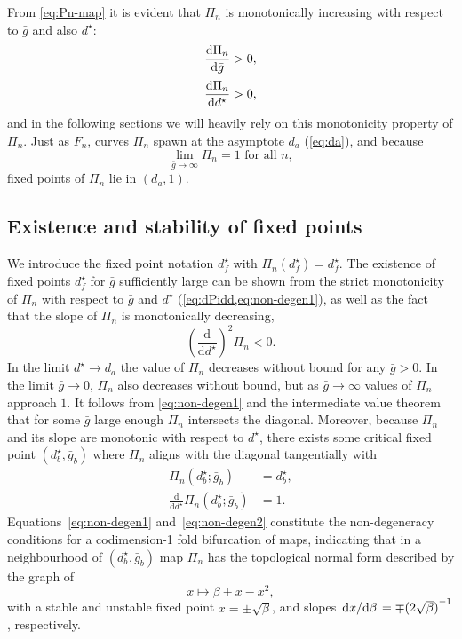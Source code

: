 \documentclass[utf8]{frontiersFPHY} %
\renewcommand{\d}{\mathrm{d}}
\newcommand{\dstar}{d^\star}
\newcommand{\gbar}{\bar g}
\begin{document}
From \cref{eq:Pn-map} it is evident that $\Pi_{n}$ is monotonically increasing with respect to $\gbar$ and also $\dstar$:
\begin{align}
  \label{eq:non-degen1}
  \dv{\Pi_{n}}{\gbar}&>0,\\[0.5ex]
  \label{eq:dPidd}
  \dv{\Pi_{n}}{\dstar}&>0,
\end{align}
and in the following sections we will heavily rely on this monotonicity property of $\Pi_n$.
Just as $F_{n}$, curves $\Pi_{n}$ spawn at the asymptote $d_{a}$ (\cref{eq:da}), and because
\begin{equation}
  \lim_{\gbar \to \infty}\Pi_{n} = 1\text{ for all }n,
\end{equation}
fixed points of $\Pi_{n}$ lie in $(d_{a}, 1)$.

\subsection{Existence and stability of fixed points}
We introduce the fixed point notation $\dstar_{f}$ with $\Pi_{n}(\dstar_{f})=\dstar_{f}$.
The existence of fixed points $\dstar_{f}$ for $\gbar$ sufficiently large can be shown from the strict monotonicity of $\Pi_{n}$ with respect to $\gbar$ and $\dstar$ (\cref{eq:dPidd,eq:non-degen1}), as well as the fact that the slope of $\Pi_{n}$ is monotonically decreasing,
\begin{equation}
  \label{eq:non-degen2}
  \left(\frac{\mathrm{d}}{\mathrm{d}\dstar}\right)^2 \Pi_{n}<0.
\end{equation}
In the limit $\dstar \to d_{a}$ the value of $\Pi_n$ decreases without bound for any $\gbar>0$.
In the limit $\gbar \to 0$, $\Pi_n$ also decreases without bound, but as $\gbar \to \infty$ values of $\Pi_n$ approach $1$.
It follows from \cref{eq:non-degen1} and the intermediate value theorem that for some $\gbar$ large enough $\Pi_n$ intersects the diagonal.
Moreover, because $\Pi_n$ and its slope are monotonic with respect to $\dstar$, there exists some critical fixed point $(\dstar_b, \gbar_b)$ where $\Pi_n$ aligns with the diagonal tangentially with
\begin{align}
  \Pi_{n}(\dstar_{b}; \gbar_{b}) &=\dstar_{b},\\
  \frac{\d}{\d \dstar}\Pi_{n}(\dstar_{b}; \gbar_{b})&=1.
\end{align}
Equations~\eqref{eq:non-degen1} and~\eqref{eq:non-degen2} constitute the non-degeneracy conditions for a codimension-1 fold bifurcation of maps, indicating that in a neighbourhood of $(\dstar_{b}, \gbar_{b})$ map $\Pi_{n}$ has the topological normal form described by the graph of
\begin{equation}
  \label{eq:normal-form}
  x\mapsto \beta+x-x^{2},
\end{equation}
with a stable and unstable fixed point $x=\pm\sqrt{\beta}$, and slopes $\dv*{x}{\beta}=\mp {(2\sqrt{\beta})}^{-1}$, respectively.
\end{document}
